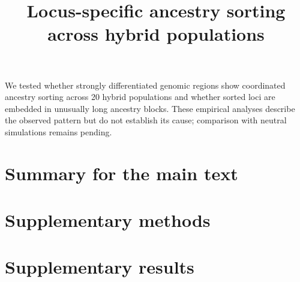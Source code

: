 \documentclass[11pt,a4paper]{article}
\title{Locus-specific ancestry sorting across hybrid populations}
\author{}
\date{}
\begin{document}
\maketitle

We tested whether strongly differentiated genomic regions show coordinated ancestry sorting across 20 hybrid populations and whether sorted loci are embedded in unusually long ancestry blocks. These empirical analyses describe the observed pattern but do not establish its cause; comparison with neutral simulations remains pending.

\section{Summary for the main text}


\clearpage
\section{Supplementary methods}


\clearpage
\section{Supplementary results}


\clearpage


\end{document}
